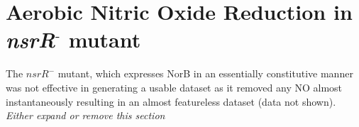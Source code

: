 \section{\texorpdfstring{Aerobic Nitric Oxide Reduction in \textit{nsrR$^\textrm{-}$} mutant}{Aerobic Nitric Oxide Reduction in nsrR- mutant}}
 The $\mathit{nsrR}^-$ mutant, which expresses NorB in an essentially constitutive manner was not effective in generating a usable dataset as it removed any NO almost instantaneously resulting in an almost featureless dataset (data not shown). \textit{Either expand or remove this section}
